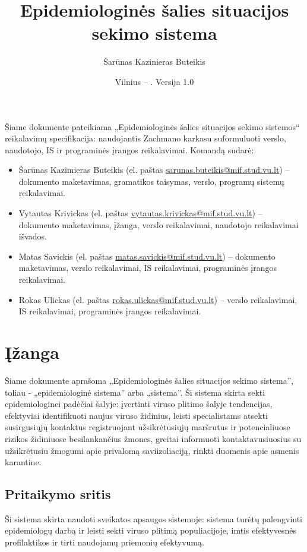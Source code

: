 \documentclass{VUMIFPSkursinis}
\title{Epidemiologinės šalies situacijos sekimo sistema}
\author{Šarūnas Kazinieras Buteikis}
\date{Vilnius – \the\year. Versija 1.0}
\begin{document}
\maketitle


Šiame dokumente pateikiama „Epidemiologinės šalies situacijos sekimo sistemos“ reikalavimų specifikacija: 
naudojantis Zachmano karkasu suformuluoti verslo, naudotojo, IS ir programinės įrangos reikalavimai. Komandą sudarė:
\begin{itemize}
	\item Šarūnas Kazimieras Buteikis (el. paštas \href{mailto:sarunas.buteikis@mif.stud.vu.lt}{sarunas.buteikis@mif.stud.vu.lt}) -- dokumento maketavimas, gramatikos taisymas, verslo, programų sistemų reikalavimai.
	\item Vytautas Krivickas (el. paštas \href{mailto:vytautas.krivickas@mif.stud.vu.lt}{vytautas.krivickas@mif.stud.vu.lt}) -- dokumento maketavimas, įžanga, verslo reikalavimai, naudotojo reikalavimai išvados.
	\item Matas Savickis (el. paštas \href{mailto:matas.savickis@mif.stud.vu.lt}{matas.savickis@mif.stud.vu.lt}) -- dokumento maketavimas, verslo reikalavimai, IS reikalavimai, programinės įrangos reikalavimai.
	\item Rokas Ulickas (el. paštas \href{mailto:rokas.ulickas@mif.stud.vu.lt}{rokas.ulickas@mif.stud.vu.lt}) -- verslo reikalavimai, IS reikalavimai, programinės įrangos reikalavimai.
\end{itemize}

\newpage

\tableofcontents

\section{Įžanga}
Šiame dokumente aprašoma „Epidemiologinės šalies situacijos sekimo sistema”, toliau - „epidemiologinė sistema” arba „sistema”.
Ši sistema skirta sekti epidemiologinei padėčiai šalyje: įvertinti viruso plitimo šalyje tendencijas,
efektyviai identifikuoti naujus viruso židinius, leisti specialistams atsekti susirgusiųjų
kontaktus registruojant užsikrėtusiųjų maršrutus ir potencialiuose rizikos židiniuose
besilankančius žmones, greitai informuoti kontaktavusiuosius su užsikrėtusiu žmogumi
apie privalomą saviizoliaciją, rinkti duomenis apie asmenis karantine.

\subsection{Pritaikymo sritis}
Ši sistema skirta naudoti sveikatos apsaugos sistemoje: sistema turėtų palengvinti
epidemiologų darbą ir leisti sekti viruso plitimą populiacijoje, imtis efektyvesnės
profilaktikos ir tirti naudojamų priemonių efektyvumą.
\end{document}
